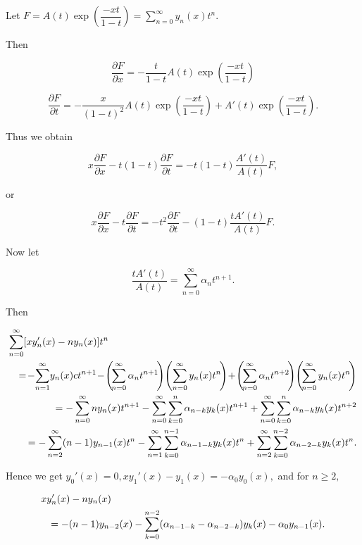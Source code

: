\begin{solution}
Let $F = A(t) \exp \left( \dfrac{-xt}{1-t} \right) = \displaystyle\sum_{n=0}^{\infty} y_n(x) t^n.$

Then

$$\dfrac{\partial F}{\partial x} = -\dfrac{t}{1-t} A(t) \exp \left( \dfrac{-xt}{1-t} \right)$$

$$\dfrac{\partial F}{\partial t} = -\dfrac{x}{(1-t)^2} A(t) \exp \left( \dfrac{-xt}{1-t} \right) + A'(t) \exp \left( \dfrac{-xt}{1-t} \right).$$

Thus we obtain

$$x \dfrac{\partial F}{\partial x} - t(1-t) \dfrac{\partial F}{\partial t} = - t(1-t) \dfrac{A'(t)}{A(t)} F,$$

or

$$x \dfrac{\partial F}{\partial x} - t \dfrac{\partial F}{\partial t} = - t^2 \dfrac{\partial F}{\partial t} - (1-t) \dfrac{tA'(t)}{A(t)} F.$$

Now let

$$\dfrac{t A'(t)}{A(t)} = \displaystyle\sum_{n=0}^{\infty} \alpha_n t^{n+1}.$$

Then

\begin{eqnarray*}
\lefteqn{\displaystyle\sum_{n=0}^{\infty} [xy_n'(x) - ny_n(x)]t^n} \\
& &=\!-\!\displaystyle\sum_{n=1}^{\infty}\!y_n(x) c t^{n+1}\! -\! \left(\! \displaystyle\sum_{n=0}^{\infty} \alpha_n t^{n+1}\! \right)\! \left( \displaystyle\sum_{n=0}^{\infty} y_n(x) t^n \!\right)\! +\! \left(\! \displaystyle\sum_{n=0}^{\infty} \alpha_n t^{n+2}\! \right)\! \left(\! \displaystyle\sum_{n=0}^{\infty} y_n(x) t^n\! \right) \\
&&= -\displaystyle\sum_{n=0}^{\infty} n y_n(x) t^{n+1} - \displaystyle\sum_{n=0}^{\infty} \displaystyle\sum_{k=0}^n \alpha_{n-k} y_k(x) t^{n+1} + \displaystyle\sum_{n=0}^{\infty} \displaystyle\sum_{k=0}^n \alpha_{n-k} y_k(x)t^{n+2} \\
&&= - \displaystyle\sum_{n=2}^{\infty} (n-1) y_{n-1}(x)t^n - \displaystyle\sum_{n=1}^{\infty} \displaystyle\sum_{k=0}^{n-1} \alpha_{n-1-k}y_k(x)t^n + \displaystyle\sum_{n=2}^{\infty} \displaystyle\sum_{k=0}^{n-2} \alpha_{n-2-k}y_k(x) t^n.
\end{eqnarray*}

Hence we get $y_0'(x) = 0, xy_1'(x) - y_1(x) = -\alpha_0 y_0(x),$ and for $n \geq 2,$

\begin{eqnarray*}
\lefteqn{x y_n'(x) - ny_n(x)} \\
&& = -(n-1)y_{n-2}(x) - \displaystyle\sum_{k=0}^{n-2} (\alpha_{n-1-k}-\alpha_{n-2-k}) y_k(x) - \alpha_0 y_{n-1}(x).
\end{eqnarray*}


\end{solution}

